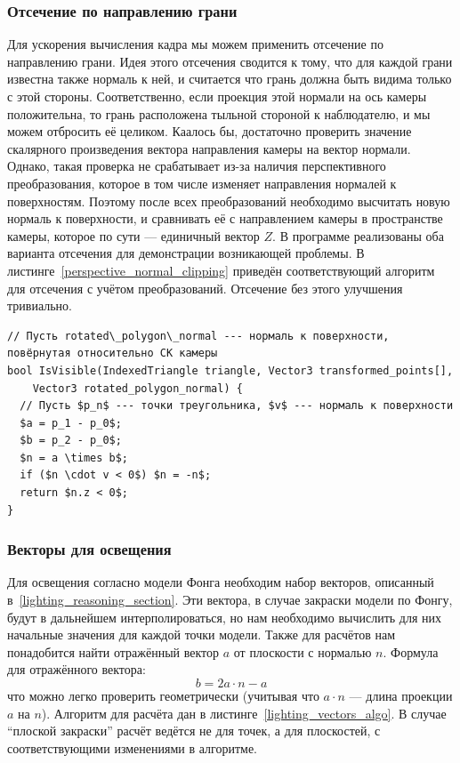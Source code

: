 \documentclass[a4paper,12pt]{report}
\numberwithin{equation}{section}
\begin{document}
\subsubsection{Отсечение по направлению грани} \label{normal_clipping_section}
Для ускорения вычисления кадра мы можем применить отсечение по направлению грани. Идея этого отсечения сводится к тому, что для каждой грани известна также нормаль к ней, и считается что грань должна быть видима только с этой стороны. Соответственно, если проекция этой нормали на ось камеры положительна, то грань расположена тыльной стороной к наблюдателю, и мы можем отбросить её целиком. Каалось бы, достаточно проверить значение скалярного произведения вектора направления камеры на вектор нормали. Однако, такая проверка не срабатывает из-за наличия перспективного преобразования, которое в том числе изменяет направления нормалей к поверхностям. Поэтому после всех преобразований необходимо высчитать новую нормаль к поверхности, и сравнивать её с направлением камеры в пространстве камеры, которое по сути --- единичный вектор $Z$. В программе реализованы оба варианта отсечения для демонстрации возникающей проблемы. В листинге~\ref{perspective_normal_clipping} приведён соответствующий алгоритм для отсечения с учётом преобразований. Отсечение без этого улучшения тривиально.

\begin{lstlisting}[float=h,caption={Отсечение по направлению грани с учётом преобразований},label=perspective_normal_clipping]
// Пусть rotated\_polygon\_normal --- нормаль к поверхности, повёрнутая относительно СК камеры
bool IsVisible(IndexedTriangle triangle, Vector3 transformed_points[],
    Vector3 rotated_polygon_normal) {
  // Пусть $p_n$ --- точки треугольника, $v$ --- нормаль к поверхности
  $a = p_1 - p_0$;
  $b = p_2 - p_0$;
  $n = a \times b$;
  if ($n \cdot v < 0$) $n = -n$;
  return $n.z < 0$;
}
\end{lstlisting}

\subsubsection{Векторы для освещения}
Для освещения согласно модели Фонга необходим набор векторов, описанный в~\ref{lighting_reasoning_section}. Эти вектора, в случае закраски модели по Фонгу, будут в дальнейшем интерполироваться, но нам необходимо вычислить для них начальные значения для каждой точки модели. Также для расчётов нам понадобится найти отражённый вектор $a$ от плоскости с нормалью $n$. Формула для отражённого вектора:
\begin{equation}
b = 2 a \cdot n - a
\end{equation}
что можно легко проверить геометрически (учитывая что $a \cdot n$ --- длина проекции $a$ на $n$). Алгоритм для расчёта дан в листинге~\ref{lighting_vectors_algo}. В случае ``плоской закраски'' расчёт ведётся не для точек, а для плоскостей, с соответствующими изменениями в алгоритме.
\end{document}

